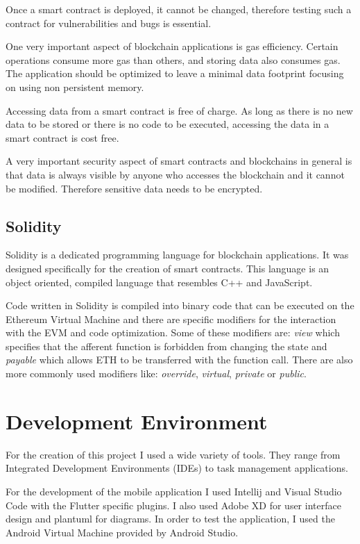 \documentclass[a4paper,12pt]{report}
\begin{document}
Once a smart contract is deployed, it cannot be changed, therefore testing such
a contract for vulnerabilities and bugs is essential.

One very important aspect of blockchain applications is gas efficiency. Certain
operations consume more gas than others, and storing data also consumes gas.
The application should be optimized to leave a minimal data footprint focusing
on using non persistent memory.

Accessing data from a smart contract is free of charge. As long as there is no
new data to be stored or there is no code to be executed, accessing the data in
a smart contract is cost free.

A very important security aspect of smart contracts and blockchains in general
is that data is always visible by anyone who accesses the blockchain and it
cannot be modified. Therefore sensitive data needs to be encrypted.

\subsection{Solidity}

Solidity\cite{solidityDocs} is a dedicated programming language for blockchain
applications. It was designed specifically for the creation of smart contracts.
This language is an object oriented, compiled language that resembles C++ and
JavaScript.

Code written in Solidity is compiled into binary code that can be executed on
the Ethereum Virtual Machine and there are specific modifiers for the
interaction with the EVM and code optimization. Some of these modifiers are:
\textit{view} which specifies that the afferent function is forbidden from
changing the state and \textit{payable} which allows ETH to be transferred with
the function call. There are also more commonly used modifiers like:
\textit{override}, \textit{virtual}, \textit{private} or \textit{public}.

\section{Development Environment}

For the creation of this project I used a wide variety of tools. They range
from Integrated Development Environments (IDEs) to task management
applications.

For the development of the mobile application I used Intellij and Visual Studio
Code with the Flutter specific plugins. I also used Adobe XD for user interface
design and plantuml for diagrams. In order to test the application, I used the
Android Virtual Machine provided by Android Studio.
\end{document}
